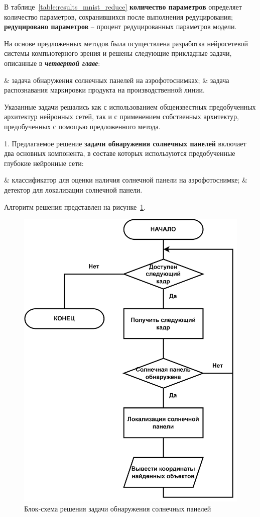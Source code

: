 \documentclass{thesisby}
\begin{document}
В таблице~\ref{table:results_mnist_reduce} \textbf{количество параметров} определяет количество параметров, сохранившихся после выполнения редуцирования; \textbf{редуцировано параметров} -- процент редуцированных параметров модели.

На основе предложенных методов была осуществлена разработка нейросетевой системы компьютерного зрения и решены следующие прикладные задачи, описанные в \textit{\textbf{четвертой главе}}:
\begin{easylistNum}
    & задача обнаружения солнечных панелей на аэрофотоснимках;
    & задача распознавания маркировки продукта на производственной линии.
\end{easylistNum}
Указанные задачи решались как с использованием общеизвестных предобученных архитектур нейронных сетей, так и с применением собственных архитектур, предобученных с помощью предложенного метода.

1. Предлагаемое решение \textbf{задачи обнаружения солнечных панелей} включает два основных компонента, в составе которых используются предобученные глубокие нейронные сети: 

\begin{easylistNum}
    & классификатор для оценки наличия солнечной панели на аэрофотоснимке;
    & детектор для локализации солнечной панели.
\end{easylistNum}

Алгоритм решения представлен на рисунке~\ref{fig:solar_system_arch}.

\begin{figure}[ht]
	\centering
	\includegraphics[width=12cm]{man-source/images/ch4/pic4-16a.png}
	\caption{Блок-схема решения задачи обнаружения солнечных панелей}
	\label{fig:solar_system_arch}
\end{figure}
\end{document}
